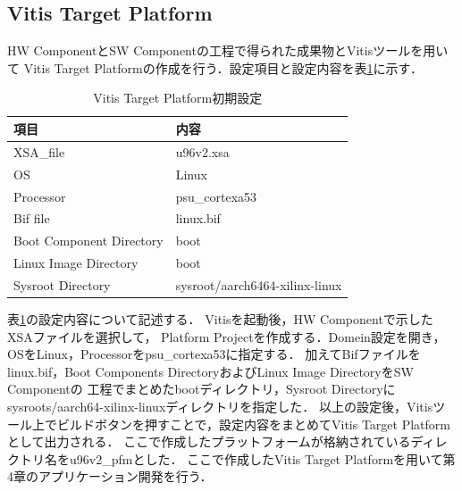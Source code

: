 \documentclass[11pt,a4j]{jreport}
\begin{document}
\subsection{Vitis Target Platform}
HW ComponentとSW Componentの工程で得られた成果物とVitisツールを用いて
Vitis Target Platformの作成を行う．設定項目と設定内容を表\ref{vtpset}に示す．
\begin{table}[H]
  \caption{Vitis Target Platform初期設定}
  \label{vtpset}
  \centering
  \begin{tabular}{ll}
    \hline
    項目 & 内容 \\
    \hline
    XSA_file & u96v2.xsa\\
    OS & Linux \\
    Processor & psu_cortexa53\\
    Bif file & linux.bif \\
    Boot Component Directory & boot \\
    Linux Image Directory & boot \\
    Sysroot Directory & sysroot/aarch6464-xilinx-linux \\
    \hline
    \end{tabular}
\end{table}
表\ref{vtpset}の設定内容について記述する．
Vitisを起動後，HW Componentで示したXSAファイルを選択して，
Platform Projectを作成する．Domein設定を開き，OSをLinux，Processorをpsu_cortexa53に指定する．
加えてBifファイルをlinux.bif，Boot Components DirectoryおよびLinux Image DirectoryをSW Componentの
工程でまとめたbootディレクトリ，Sysroot Directoryにsysroots/aarch64-xilinx-linuxディレクトリを指定した．
以上の設定後，Vitisツール上でビルドボタンを押すことで，設定内容をまとめてVitis Target Platformとして出力される．
ここで作成したプラットフォームが格納されているディレクトリ名をu96v2_pfmとした．
ここで作成したVitis Target Platformを用いて第4章のアプリケーション開発を行う．
\end{document}
